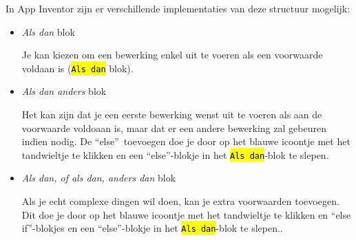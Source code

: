 In App Inventor zijn er verschillende implementaties van deze structuur mogelijk:
\begin{itemize}
	\item \emph{Als dan} blok \\
	\begin{minipage}{.5\linewidth}
	Je kan kiezen om een bewerking enkel uit te voeren als een voorwaarde voldaan is (\hl{\texttt{Als dan}} blok).
	\end{minipage}
	\begin{minipage}{.5\linewidth}
	\end{minipage}	
	\item \emph{Als dan anders} blok \\
	\begin{minipage}{.5\linewidth}
			Het kan zijn dat je een eerste bewerking wenst uit te voeren als aan de voorwaarde voldoaan is, maar dat er een andere bewerking zal gebeuren indien nodig. De \textquotedblleft else\textquotedblright \ toevoegen doe je door op het blauwe icoontje met het tandwieltje te klikken en een \textquotedblleft else\textquotedblright -blokje in het \hl{\texttt{Als dan}}-blok te slepen.
	\end{minipage}
	\begin{minipage}{.5\linewidth}
	\end{minipage}	
	\item \emph{Als dan, of als dan, anders dan} blok \\
	\begin{minipage}{.5\linewidth}
		Als je echt complexe dingen wil doen, kan je extra voorwaarden toevoegen. Dit doe je door op het blauwe icoontje met het tandwieltje te klikken en \textquotedblleft else if\textquotedblright -blokjes en een \textquotedblleft else\textquotedblright -blokje in het \hl{\texttt{Als dan}}-blok te slepen..
	\end{minipage}
	\begin{minipage}{.5\linewidth}
	\end{minipage}	
\end{itemize}

